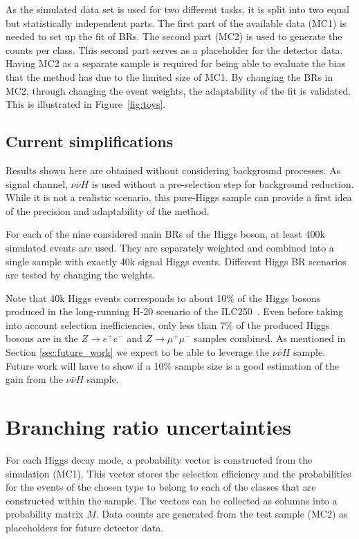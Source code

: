 \documentclass[11pt, hidelinks, a4paper]{scrartcl}
\begin{document}
As the simulated data set is used for two different tasks,
it is split into two equal but statistically independent parts.
The first part of the available data (MC1) is needed
to set up the fit of BRs.
The second part (MC2) is used to generate the counts per class.
This second part serves as a placeholder for the detector data.
Having MC2 as a separate sample is required
for being able to evaluate the bias
that the method has due to the limited size of MC1.
By changing the BRs in MC2, through changing the event weights,
the adaptability of the fit is validated.
This is illustrated in Figure~\ref{fig:toys}.

\subsection{Current simplifications}\label{subsec:simplifications}
Results shown here are obtained without considering background processes.
As signal channel, $\nu \bar{\nu} H$ is used
without a pre-selection step for background reduction.
While it is not a realistic scenario,
this pure-Higgs sample can provide a first idea
of the precision and adaptability of the method.

For each of the nine considered main BRs of the Higgs boson,
at least 400k simulated events are used.
They are separately weighted and combined into a single sample
with exactly 40k signal Higgs events.
Different Higgs BR scenarios are tested by changing the weights.

Note that 40k Higgs events corresponds to about 10\% of the Higgs bosons
produced in the long-running H-20 scenario of the ILC250~\cite{ILC_Scenarios}.
Even before taking into account selection inefficiencies,
only less than 7\% of the produced Higgs bosons
are in the $Z \to e^+ e^-$ and $Z \to \mu^+ \mu^-$ samples combined.
As mentioned in Section \ref{sec:future_work}
we expect to be able to leverage the $\nu \bar{\nu} H$ sample.
Future work will have to show if a 10\% sample size
is a good estimation of the gain from the $\nu \bar{\nu} H$ sample.

\section{Branching ratio uncertainties}\label{sec:fit}

For each Higgs decay mode, a probability vector is
constructed from the simulation (MC1).
This vector stores the selection efficiency and the probabilities
for the events of the chosen type to belong to each of the classes
that are constructed within the sample.
The vectors can be collected as columns into a probability matrix $M$.
Data counts are generated from the test sample (MC2)
as placeholders for future detector data.
\end{document}
